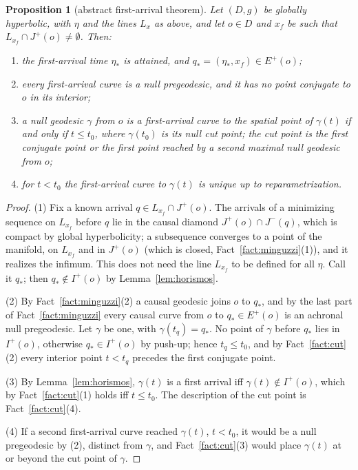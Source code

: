 \documentclass[aip,jmp,amsmath,amssymb,reprint]{revtex4-2}
\theoremstyle{plain}
\newtheorem{proposition}{Proposition}[section]
\theoremstyle{definition}
\begin{document}
\begin{proposition}[abstract first-arrival theorem]\label{prop:first-arrival}
Let $(D,g)$ be globally hyperbolic, with $\eta$ and the lines $L_x$ as above, and let
$o\in D$ and $x_f$ be such that $L_{x_f}\cap J^+(o)\neq\emptyset$. Then:
\begin{enumerate}
\item the first-arrival time $\eta_*$ is attained, and $q_*=(\eta_*,x_f)\in E^+(o)$;
\item every first-arrival curve is a null pregeodesic, and it has no point conjugate to
  $o$ in its interior;
\item a null geodesic $\gamma$ from $o$ is a first-arrival curve to the spatial point of
  $\gamma(t)$ if and only if $t\le t_0$, where $\gamma(t_0)$ is its null cut point; the cut
  point is the first conjugate point or the first point reached by a second maximal
  null geodesic from $o$;
\item for $t<t_0$ the first-arrival curve to $\gamma(t)$ is unique up to
  reparametrization.
\end{enumerate}
\end{proposition}

\begin{proof}
(1) Fix a known arrival $q\in L_{x_f}\cap J^+(o)$. The arrivals of a minimizing sequence on
$L_{x_f}$ before $q$ lie in the causal diamond $J^+(o)\cap J^-(q)$, which is compact by
global hyperbolicity; a subsequence converges to a point of the manifold, on $L_{x_f}$ and in
$J^+(o)$ (which is closed, Fact~\ref{fact:minguzzi}(1)), and it realizes the infimum. This
does not need the line $L_{x_f}$ to be defined for all $\eta$. Call it $q_*$; then
$q_*\notin I^+(o)$ by Lemma~\ref{lem:horismos}.

(2) By Fact~\ref{fact:minguzzi}(2) a causal geodesic joins $o$ to $q_*$, and by the last
part of Fact~\ref{fact:minguzzi} every causal curve from $o$ to $q_*\in E^+(o)$ is an
achronal null pregeodesic. Let $\gamma$ be one, with $\gamma(t_q)=q_*$. No point of
$\gamma$ before $q_*$ lies in $I^+(o)$, otherwise $q_*\in I^+(o)$ by push-up; hence
$t_q\le t_0$, and by Fact~\ref{fact:cut}(2) every interior point $t<t_q$ precedes the
first conjugate point.

(3) By Lemma~\ref{lem:horismos}, $\gamma(t)$ is a first arrival iff $\gamma(t)\notin I^+(o)$,
which by Fact~\ref{fact:cut}(1) holds iff $t\le t_0$. The description of the cut
point is Fact~\ref{fact:cut}(4).

(4) If a second first-arrival curve reached $\gamma(t)$, $t<t_0$, it would be a null
pregeodesic by (2), distinct from $\gamma$, and Fact~\ref{fact:cut}(3) would place
$\gamma(t)$ at or beyond the cut point of $\gamma$.
\end{proof}
\end{document}
